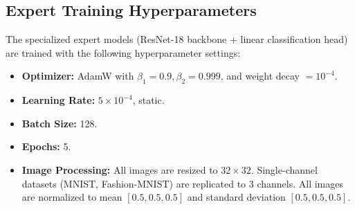\documentclass{article}
\theoremstyle{plain}
\theoremstyle{definition}
\theoremstyle{remark}
\begin{document}
\subsection{Expert Training Hyperparameters}
The specialized expert models (ResNet-18 backbone + linear classification head) are trained with the following hyperparameter settings:
\begin{itemize}
  \item \textbf{Optimizer:} AdamW with $\beta_1 = 0.9, \beta_2 = 0.999$, and weight decay $= 10^{-4}$.
  \item \textbf{Learning Rate:} $5 \times 10^{-4}$, static.
  \item \textbf{Batch Size:} 128.
  \item \textbf{Epochs:} 5.
  \item \textbf{Image Processing:} All images are resized to $32 \times 32$. Single-channel datasets (MNIST, Fashion-MNIST) are replicated to 3 channels. All images are normalized to mean $[0.5, 0.5, 0.5]$ and standard deviation $[0.5, 0.5, 0.5]$.
\end{itemize}
\end{document}
